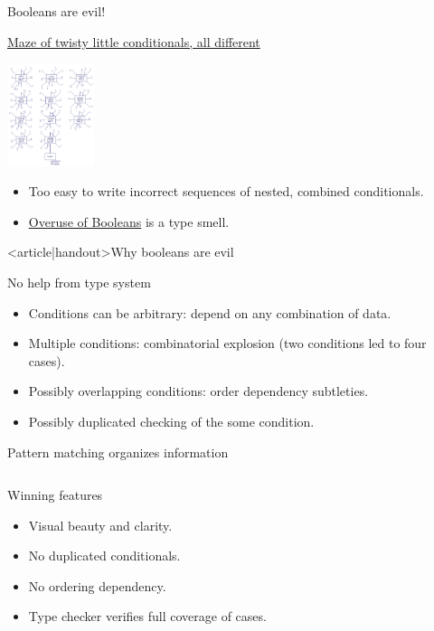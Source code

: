 \begin{frame}{Booleans are evil!}
\begin{block}{\href{http://en.wikiquote.org/wiki/Colossal\_Cave\_Adventure}{Maze of twisty little conditionals, all different}}
  \begin{center}
    \includegraphics[height=3cm]{dmaze.png}
  \end{center}

  \begin{itemize}
  \item Too easy to write incorrect sequences of nested, combined conditionals.
  \item \href{http://existentialtype.wordpress.com/2011/03/15/boolean-blindness/}{Overuse of Booleans} is a type \alert{smell}.
  \end{itemize}
  \end{block}
\end{frame}

\begin{frame}<article|handout>{Why booleans are evil}
  \begin{block}{No help from type system}
    \begin{itemize}
    \item Conditions can be arbitrary: depend on \alert{any} combination of data.
    \item Multiple conditions: combinatorial explosion (two conditions led to four cases).
    \item Possibly overlapping conditions: order dependency subtleties.
    \item Possibly duplicated checking of the some condition.
    \end{itemize}
  \end{block}
\end{frame}

\begin{frame}[fragile]{Pattern matching organizes information}
  \inputminted{rust}{FizzBuzz2.rs}

  \begin{block}{Winning features}
    \begin{itemize}
    \item Visual \alert{beauty} and clarity.
    \item No duplicated conditionals.
    \item No ordering dependency.
    \item \alert{Type checker} verifies \alert{full coverage} of cases.
    \end{itemize}
  \end{block}
\end{frame}

